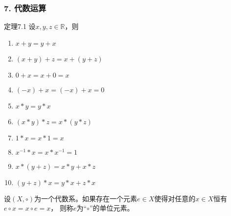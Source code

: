 \documentclass{beamer}
\begin{document}
\begin{CJK*}{UTF8}{gbsn}
\begin{frame}
  \frametitle{7. 代数运算}
  \begin{minipage}[t]{0.49\linewidth}
  \begin{block}{定理7.1}
    设$x, y, z \in \mathbb{R}$，则
   \begin{enumerate}
   \item   $x + y = y + x$
   \item   $(x + y) + z = x + (y + z)$
   \item   $0 + x = x + 0 = x$
   \item   $(-x) + x = (-x) + x = 0$
   \item   $x * y = y * x$
   \item   $(x * y) * z = x * (y *z)$
   \item   $1 * x = x * 1 = x$
   \item   $x^{-1} * x = x * x^{-1} = 1$
   \item   $x* (y + z) = x * y + x * z$
   \item   $(y + z) * x = y * x + z * x$
    \end{enumerate}
  \end{block}\pause
\end{minipage}
\begin{minipage}[t]{0.49\linewidth}
  \begin{Def}
    设$(X, \circ)$为一个代数系。如果存在一个元素$e\in X$使得对任意的$x\in X$恒有$e\circ x = x \circ e = x$， 则称$e$为“$\circ$”的\alert{单位元素}。
  \end{Def}
\end{minipage}
\end{frame}


\end{CJK*}
\end{document}
